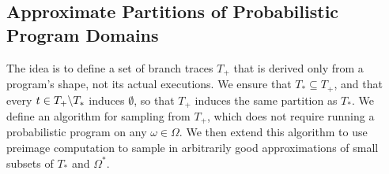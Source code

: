 \subsection{Approximate Partitions of Probabilistic Program Domains}

The idea is to define a set of branch traces $T_+$ that is derived only from a program's shape, not its actual executions.
We ensure that $T_* \subseteq T_+$, and that every $t \in T_+ \backslash T_*$ induces $\emptyset$, so that $T_+$ induces the same partition as $T_*$.
We define an algorithm for sampling from $T_+$, which does not require running a probabilistic program on any $\omega \in \Omega$.
We then extend this algorithm to use preimage computation to sample in arbitrarily good approximations of small subsets of $T_*$ and $\Omega^*$.

\begin{figure}[!tb]\centering
\smallmathfont
{}
\end{figure}
